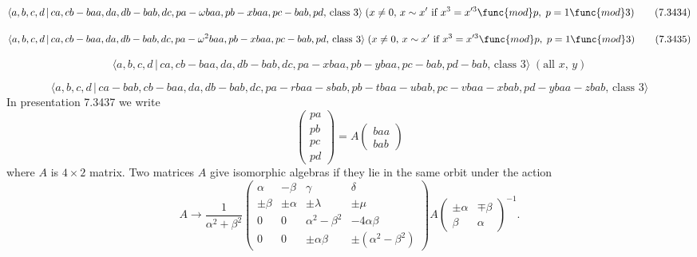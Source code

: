 \documentclass[10pt]{article}
\begin{document}
\begin{equation}
\langle a,b,c,d\,|\,ca,cb-baa,da,db-bab,dc,pa-\omega baa,pb-xbaa,pc-bab,pd,\,%
\text{class }3\rangle \;(x\neq 0,\,x\sim x^{\prime }\text{ if }%
x^{3}=x^{\prime 3}\func{mod}p,\;p=1\func{mod}3)  \tag{7.3434}
\end{equation}

\begin{equation}
\langle a,b,c,d\,|\,ca,cb-baa,da,db-bab,dc,pa-\omega
^{2}baa,pb-xbaa,pc-bab,pd,\,\text{class }3\rangle \;(x\neq 0,\,x\sim
x^{\prime }\text{ if }x^{3}=x^{\prime 3}\func{mod}p,\;p=1\func{mod}3) 
\tag{7.3435}
\end{equation}

\begin{equation}
\langle a,b,c,d\,|\,ca,cb-baa,da,db-bab,dc,pa-xbaa,pb-ybaa,pc-bab,pd-bab,\,%
\text{class }3\rangle \;(\text{all }x,\,y)  \tag{7.3436}
\end{equation}

\begin{equation}
\langle
a,b,c,d\,|%
\,ca-bab,cb-baa,da,db-bab,dc,pa-rbaa-sbab,pb-tbaa-ubab,pc-vbaa-xbab,pd-ybaa-zbab,\,%
\text{class }3\rangle  \tag{7.3437}
\end{equation}%
In presentation 7.3437 we write%
\[
\left( 
\begin{array}{c}
pa \\ 
pb \\ 
pc \\ 
pd%
\end{array}%
\right) =A\left( 
\begin{array}{c}
baa \\ 
bab%
\end{array}%
\right) 
\]%
where $A$ is $4\times 2$ matrix. Two matrices $A$ give isomorphic algebras
if they lie in the same orbit under the action%
\[
A\rightarrow \frac{1}{\alpha ^{2}+\beta ^{2}}\left( 
\begin{array}{cccc}
\alpha & -\beta & \gamma & \delta \\ 
\pm \beta & \pm \alpha & \pm \lambda & \pm \mu \\ 
0 & 0 & \alpha ^{2}-\beta ^{2} & -4\alpha \beta \\ 
0 & 0 & \pm \alpha \beta & \pm (\alpha ^{2}-\beta ^{2})%
\end{array}%
\right) A\left( 
\begin{array}{cc}
\pm \alpha & \mp \beta \\ 
\beta & \alpha%
\end{array}%
\right) ^{-1}. 
\]
\end{document}
